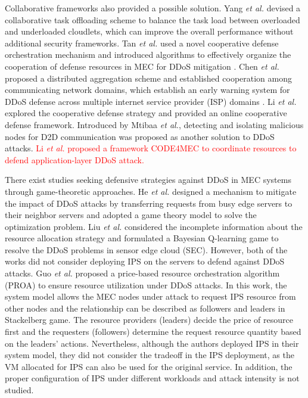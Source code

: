 \documentclass[10pt,journal, compsoc]{IEEEtran}
\begin{document}
Collaborative frameworks also provided a possible solution. Yang \emph{et al.} devised a collaborative task offloading scheme to balance the task load between overloaded and underloaded cloudlets, which can improve the overall performance without additional security frameworks\cite{Yang}. Tan \emph{et al.} used a novel cooperative defense orchestration mechanism and introduced algorithms to effectively organize the cooperation of defense resources in MEC for DDoS mitigation \cite{Tan}. Chen \emph{et al.} proposed a distributed aggregation scheme and established cooperation among communicating network domains, which establish an early warning system for DDoS defense across multiple internet service provider (ISP) domains \cite{Chen}. Li \emph{et al.} explored the cooperative defense strategy and provided an online cooperative defense framework\cite{Li}. Introduced by Mtibaa \emph{et al.}, detecting and isolating malicious nodes for D2D communication was proposed as another solution to DDoS attacks\cite{Mtibaa}. \textcolor{red}{Li \emph{et al.} proposed a framework CODE4MEC to coordinate resources to defend application-layer DDoS attack.\cite{Li2}} 

There exist studies seeking defensive strategies against DDoS in MEC systems through game-theoretic approaches. He \emph{et al.} designed a mechanism to mitigate the impact of DDoS attacks by transferring requests from busy edge servers to their neighbor servers and adopted a game theory model to solve the optimization problem\cite{He}.  Liu \emph{et al.} considered the incomplete information about the resource allocation strategy and formulated a Bayesian Q-learning game to resolve the DDoS problems in sensor edge cloud (SEC)\cite{Liu3}. However, both of the works did not consider deploying IPS on the servers to defend against DDoS attacks. Guo \emph{et al.} proposed a price-based resource orchestration algorithm (PROA) to ensure resource utilization under DDoS attacks\cite{Guo2}. In this work, the system model allows the MEC nodes under attack to request IPS resource from other nodes and the relationship can be described as followers and leaders in Stackelberg game. The resource providers (leaders) decide the price of resource first and the requesters (followers) determine the request resource quantity based on the leaders' actions. Nevertheless, although the authors deployed IPS in their system model, they did not consider the tradeoff in the IPS deployment, as the VM allocated for IPS can also be used for the original service. In addition, the proper configuration of IPS under different workloads and attack intensity is not studied. 
\end{document}
